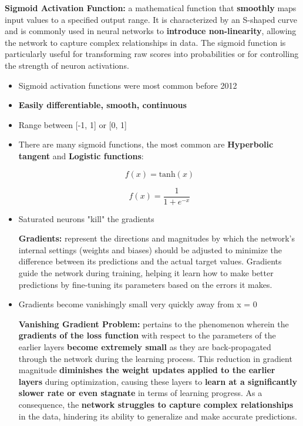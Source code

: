 \begin{definition}
    \textbf{Sigmoid Activation Function:} a mathematical function that \textbf{smoothly} maps input values to a specified output range. It is characterized by an S-shaped curve and is commonly used in neural networks to \textbf{introduce non-linearity}, allowing the network to capture complex relationships in data. The sigmoid function is particularly useful for transforming raw scores into probabilities or for controlling the strength of neuron activations.
\end{definition}
\begin{itemize}
    \item Sigmoid activation functions were most common before 2012
    \item \textbf{Easily differentiable, smooth, continuous}
    \item Range between [-1, 1] or [0, 1]
    \item There are many sigmoid functions, the most common are \textbf{Hyperbolic tangent} and \textbf{Logistic functions}:

\[f(x) = \text{tanh}(x)\]

\[f(x) = \frac{1}{1 + e^{-x}}\]
\item Saturated neurons "kill" the gradients
\begin{definition}
    \textbf{Gradients:} represent the directions and magnitudes by which the network's internal settings (weights and biases) should be adjusted to minimize the difference between its predictions and the actual target values. Gradients guide the network during training, helping it learn how to make better predictions by fine-tuning its parameters based on the errors it makes.
\end{definition}
\item Gradients become vanishingly small very quickly away from x = 0
\begin{theorem}
    \textbf{Vanishing Gradient Problem:}  pertains to the phenomenon wherein the \textbf{gradients of the loss function} with respect to the parameters of the earlier layers \textbf{become extremely small} as they are back-propagated through the network during the learning process. This reduction in gradient magnitude \textbf{diminishes the weight updates applied to the earlier layers} during optimization, causing these layers to \textbf{learn at a significantly slower rate or even stagnate} in terms of learning progress. As a consequence, the \textbf{network struggles to capture complex relationships} in the data, hindering its ability to generalize and make accurate predictions.
\end{theorem}
\end{itemize}
